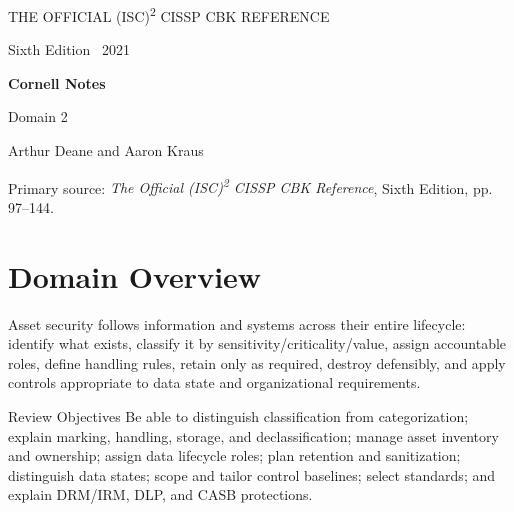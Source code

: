 \documentclass[10pt,letterpaper]{article}
\begin{document}
\hypersetup{pageanchor=false}
\begin{titlepage}\pagecolor{navy}\color{white}
\vspace*{1.0in}
{\Large THE OFFICIAL (ISC)\textsuperscript{2} CISSP CBK REFERENCE\par}\vspace{0.25in}
{\large Sixth Edition \textbullet\ 2021\par}\vfill
{\Huge\bfseries Cornell Notes\par}\vspace{0.25in}
{\LARGE Domain 2\par}\vspace{0.08in}{\LARGE\bfseries Asset Security\par}\vfill
{\large Arthur Deane and Aaron Kraus\par}\vspace{0.12in}{\normalsize Study and review companion\par}\vspace{0.35in}
{\small Primary source: \textit{The Official (ISC)\textsuperscript{2} CISSP CBK Reference}, Sixth Edition, pp. 97--144.\par}
\end{titlepage}
\hypersetup{pageanchor=true}\nopagecolor\color{black}

\section*{\color{navy}Domain Overview}
Asset security follows information and systems across their entire lifecycle: identify what exists, classify it by sensitivity/criticality/value, assign accountable roles, define handling rules, retain only as required, destroy defensibly, and apply controls appropriate to data state and organizational requirements.

\begin{summarybox}{Review Objectives}
Be able to distinguish classification from categorization; explain marking, handling, storage, and declassification; manage asset inventory and ownership; assign data lifecycle roles; plan retention and sanitization; distinguish data states; scope and tailor control baselines; select standards; and explain DRM/IRM, DLP, and CASB protections.
\end{summarybox}
\end{document}
